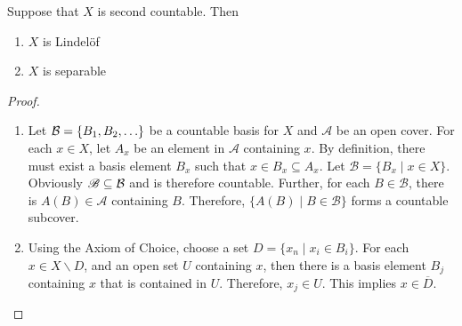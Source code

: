 \begin{theorem}
    Suppose that $X$ is second countable. Then 
    \begin{enumerate}
        \item $X$ is Lindel\"of 
        \item $X$ is separable
    \end{enumerate}
\end{theorem}
\begin{proof}
    \hfill 
    \begin{enumerate}
        \item Let $\mathcal{B} = \{B_1,B_2,\ldots\}$ be a countable basis for $X$ and $\mathscr{A}$ be an open cover. For each $x\in X$, let $A_x$ be an element in $\mathscr{A}$ containing $x$. By definition, there must exist a basis element $B_x$ such that $x\in B_x\subseteq A_x$. Let $\mathscr{B} = \{B_x\mid x\in X\}$. Obviously $\mathscr{B}\subseteq\mathcal{B}$ and is therefore countable. Further, for each $B\in\mathscr{B}$, there is $A(B)\in\mathscr{A}$ containing $B$. Therefore, $\{A(B)\mid B\in\mathscr{B}\}$ forms a countable subcover.

        \item Using the Axiom of Choice, choose a set $D = \{x_n\mid x_i\in B_i\}$. For each $x\in X\backslash D$, and an open set $U$ containing $x$, then there is a basis element $B_j$ containing $x$ that is contained in $U$. Therefore, $x_j\in U$. This implies $x\in\overline{D}$.
    \end{enumerate}
\end{proof}

